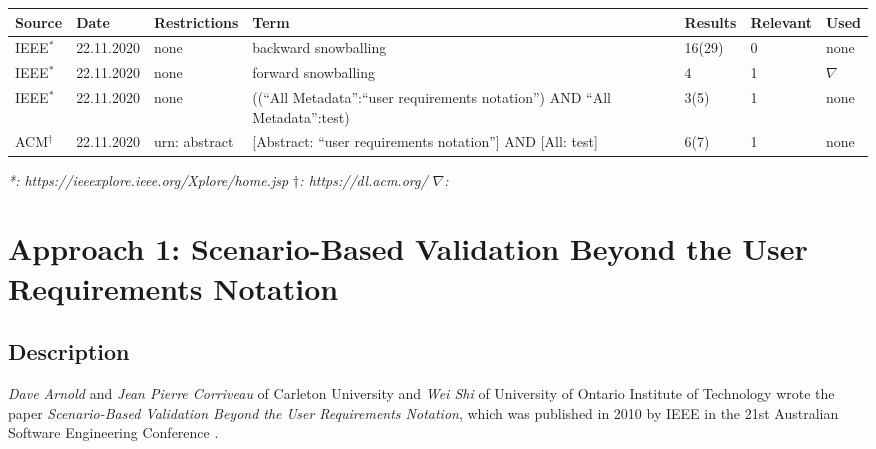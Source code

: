 \begin{table}[h]
	\begin{small}
	\caption{Literature Research Documentation.}
	\begin{longtable}{p{1cm}|p{1.5cm}|>{\raggedright}p{2cm}|>{\raggedright}p{3.7cm}|p{1.3cm}|p{1.4cm}|p{0.7cm}}
		\hline
		\textbf{Source} & \textbf{Date} & \textbf{Restrictions} & \textbf{Term} & \textbf{Results} & \textbf{Relevant} & \textbf{Used}\\
		\hline
		IEEE$^*$ & 22.11.2020 & none & backward snowballing & 16(29) & 0 & none \\
		\hline
		IEEE$^*$ & 22.11.2020 & none & forward snowballing & 4 & 1 & $\nabla$ \\
		\hline
		IEEE$^*$ & 22.11.2020 & none & ((\enquote{All Metadata}:\enquote{user requirements notation}) AND \enquote{All Metadata}:test) & 3(5) & 1 & none\\
		\hline
		ACM$^\dagger$ & 22.11.2020 & urn: abstract & [Abstract: \enquote{user requirements notation}] AND [All: test] & 6(7) & 1 & none \\
		\hline
	\end{longtable}
	\textit{*: https://ieeexplore.ieee.org/Xplore/home.jsp \quad $\dagger$: https://dl.acm.org/ \quad $\nabla$: \cite{BoucherMussbacher2017}}
	\label{tab:08_research}
\end{small}
\end{table}
\section{Approach 1: Scenario-Based Validation Beyond the User Requirements Notation}
\label{topic08:sectionApproach1}

\subsection{Description}

\textit{Dave Arnold} and \textit{Jean Pierre Corriveau} of Carleton University and \textit{Wei Shi} of University of Ontario Institute of Technology wrote the paper \textit{Scenario-Based Validation Beyond the User Requirements Notation}, which was published in 2010 by IEEE in the 21st Australian Software Engineering Conference \cite{ArnoldCorriveauShi2010}.


